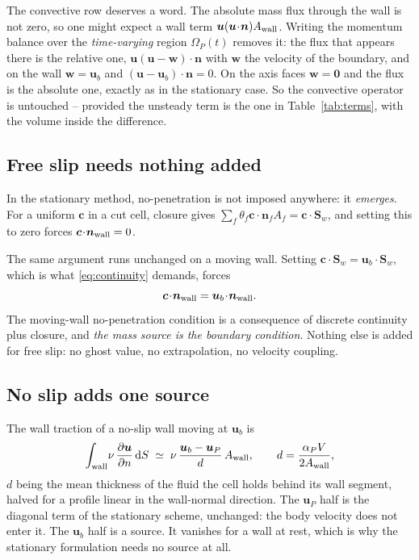 \documentclass[11pt,a4paper]{article}
\theoremstyle{remark}
\newcommand{\uu}{\bm{u}}
\newcommand{\nn}{\bm{n}}
\newcommand{\Sw}{\bm{S}_w}
\newcommand{\ub}{\uu_b}
\newcommand{\dd}{\,\mathrm{d}}
\begin{document}
The convective row deserves a word. The absolute mass flux through the wall is not zero, so one
might expect a wall term $\uu(\uu\!\cdot\!\nn)A_{\rm wall}$. Writing the momentum balance over
the \emph{time-varying} region $\Omega_P(t)$ removes it: the flux that appears there is the
relative one, $\uu(\uu-\bm{w})\!\cdot\!\nn$ with $\bm{w}$ the velocity of the boundary, and on the
wall $\bm{w}=\ub$ and $(\uu-\ub)\!\cdot\!\nn=0$. On the axis faces $\bm{w}=\bm{0}$ and the flux is
the absolute one, exactly as in the stationary case. So the convective operator is untouched --
provided the unsteady term is the one in Table~\ref{tab:terms}, with the volume inside the
difference.

\subsection{Free slip needs nothing added}

In the stationary method, no-penetration is not imposed anywhere: it \emph{emerges}. For a
uniform $\bm{c}$ in a cut cell, closure gives $\sum_f\theta_f\bm{c}\!\cdot\!\nn_fA_f=
\bm{c}\!\cdot\!\Sw$, and setting this to zero forces $\bm{c}\!\cdot\!\nn_{\rm wall}=0$.

The same argument runs unchanged on a moving wall. Setting
$\bm{c}\!\cdot\!\Sw=\ub\!\cdot\!\Sw$, which is what \eqref{eq:continuity} demands, forces
\begin{equation}
\bm{c}\!\cdot\!\nn_{\rm wall}=\ub\!\cdot\!\nn_{\rm wall}.
\end{equation}
The moving-wall no-penetration condition is a consequence of discrete continuity plus closure,
and \emph{the mass source is the boundary condition}. Nothing else is added for free slip: no
ghost value, no extrapolation, no velocity coupling.

\subsection{No slip adds one source}

The wall traction of a no-slip wall moving at $\ub$ is
\begin{equation}
\int_{\rm wall}\!\nu\,\frac{\partial \uu}{\partial n}\dd S
\;\simeq\;\nu\,\frac{\ub-\uu_P}{d}\,A_{\rm wall},
\qquad d=\frac{\alpha_P V}{2A_{\rm wall}},
\label{eq:noslip}
\end{equation}
$d$ being the mean thickness of the fluid the cell holds behind its wall segment, halved for a
profile linear in the wall-normal direction. The $\uu_P$ half is the diagonal term of the
stationary scheme, unchanged: the body velocity does not enter it. The $\ub$ half is a source.
It vanishes for a wall at rest, which is why the stationary formulation needs no source at all.
\end{document}
